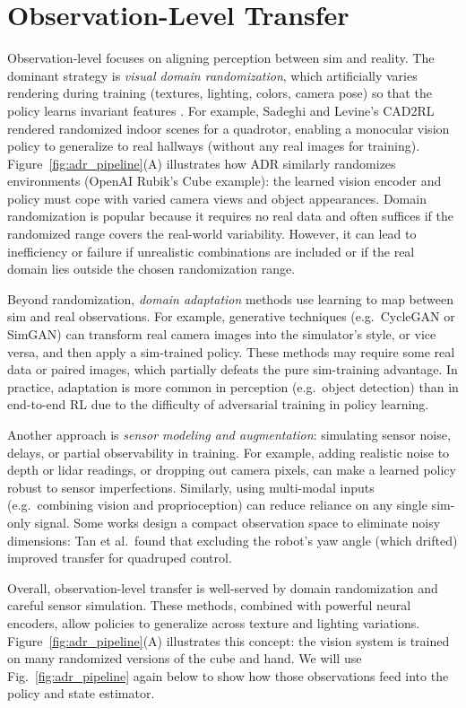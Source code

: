 \section{Observation-Level Transfer}
Observation-level \simtoreal focuses on aligning perception between sim and reality. The dominant strategy is \emph{visual domain randomization}, which artificially varies rendering during training (textures, lighting, colors, camera pose) so that the policy learns invariant features \cite{Sadeghi2017,Tobin2017}. For example, Sadeghi and Levine’s CAD2RL rendered randomized indoor scenes for a quadrotor, enabling a monocular vision policy to generalize to real hallways (without any real images for training)\cite{Sadeghi2017}. Figure~\ref{fig:adr_pipeline}(A) illustrates how ADR similarly randomizes environments (OpenAI Rubik’s Cube example): the learned vision encoder and policy must cope with varied camera views and object appearances. Domain randomization is popular because it requires no real data and often suffices if the randomized range covers the real-world variability. However, it can lead to inefficiency or failure if unrealistic combinations are included or if the real domain lies outside the chosen randomization range.

Beyond randomization, \emph{domain adaptation} methods use learning to map between sim and real observations. For example, generative techniques (e.g.\ CycleGAN or SimGAN) can transform real camera images into the simulator’s style, or vice versa, and then apply a sim-trained policy\cite{Tzeng2017}. These methods may require some real data or paired images, which partially defeats the pure sim-training advantage. In practice, adaptation is more common in perception (e.g.\ object detection) than in end-to-end RL due to the difficulty of adversarial training in policy learning.

Another approach is \emph{sensor modeling and augmentation}: simulating sensor noise, delays, or partial observability in training. For example, adding realistic noise to depth or lidar readings, or dropping out camera pixels, can make a learned policy robust to sensor imperfections. Similarly, using multi-modal inputs (e.g.\ combining vision and proprioception) can reduce reliance on any single sim-only signal. Some works design a compact observation space to eliminate noisy dimensions: Tan et al.\ found that excluding the robot’s yaw angle (which drifted) improved transfer for quadruped control\cite{Tan2018}. 

Overall, observation-level transfer is well-served by domain randomization and careful sensor simulation. These methods, combined with powerful neural encoders, allow policies to generalize across texture and lighting variations\cite{Tobin2017,Sadeghi2017}. Figure~\ref{fig:adr_pipeline}(A) illustrates this concept: the vision system is trained on many randomized versions of the cube and hand. We will use Fig.~\ref{fig:adr_pipeline} again below to show how those observations feed into the policy and state estimator.

